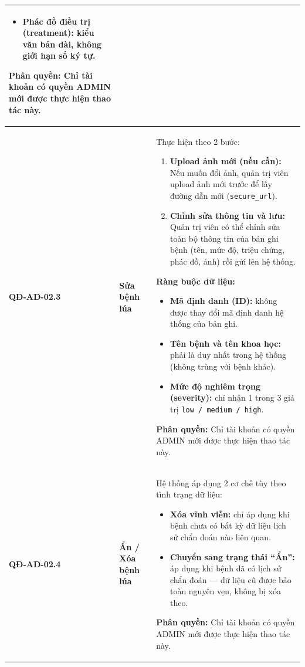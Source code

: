 \documentclass[12pt,a4paper]{article}
\begin{document}
\begin{longtable}{|
        >{\raggedright\arraybackslash}p{2.2cm}|
        >{\raggedright\arraybackslash}p{2.8cm}|
        >{\raggedright\arraybackslash}p{9.8cm}|}
\begin{itemize}[leftmargin=*,topsep=2pt,itemsep=1pt]
        \item \textbf{Phác đồ điều trị (treatment):} kiểu văn bản dài, không giới hạn số ký tự.
    \end{itemize}
    \textbf{Phân quyền:} Chỉ tài khoản có quyền ADMIN mới được thực hiện thao tác này.                                                                      \\
    \hline
    \textbf{QĐ-AD-02.3}  & \textbf{Sửa bệnh lúa}           &
    Thực hiện theo 2 bước:
    \begin{enumerate}[leftmargin=*,topsep=2pt,itemsep=1pt]
        \item \textbf{Upload ảnh mới (nếu cần):} Nếu muốn đổi ảnh, quản trị viên upload ảnh mới trước để lấy đường dẫn mới (\texttt{secure\_url}).
        \item \textbf{Chỉnh sửa thông tin và lưu:} Quản trị viên có thể chỉnh sửa toàn bộ thông tin của bản ghi bệnh (tên, mức độ, triệu chứng, phác đồ, ảnh) rồi gửi lên hệ thống.
    \end{enumerate}
    \textbf{Ràng buộc dữ liệu:}
    \begin{itemize}[leftmargin=*,topsep=2pt,itemsep=1pt]
        \item \textbf{Mã định danh (ID):} không được thay đổi mã định danh hệ thống của bản ghi.
        \item \textbf{Tên bệnh và tên khoa học:} phải là duy nhất trong hệ thống (không trùng với bệnh khác).
        \item \textbf{Mức độ nghiêm trọng (severity):} chỉ nhận 1 trong 3 giá trị \texttt{low / medium / high}.
    \end{itemize}
    \textbf{Phân quyền:} Chỉ tài khoản có quyền ADMIN mới được thực hiện thao tác này.                                                                      \\
    \hline
    \textbf{QĐ-AD-02.4}  & \textbf{Ẩn / Xóa bệnh lúa}      &
    Hệ thống áp dụng 2 cơ chế tùy theo tình trạng dữ liệu:
    \begin{itemize}[leftmargin=*,topsep=2pt,itemsep=1pt]
        \item \textbf{Xóa vĩnh viễn:} chỉ áp dụng khi bệnh chưa có bất kỳ dữ liệu lịch sử chẩn đoán nào liên quan.
        \item \textbf{Chuyển sang trạng thái ``Ẩn'':} áp dụng khi bệnh đã có lịch sử chẩn đoán --- dữ liệu cũ được bảo toàn nguyên vẹn, không bị xóa theo.
    \end{itemize}
    \textbf{Phân quyền:} Chỉ tài khoản có quyền ADMIN mới được thực hiện thao tác này.                                                                      \\
    \hline
\end{longtable}
\end{document}
